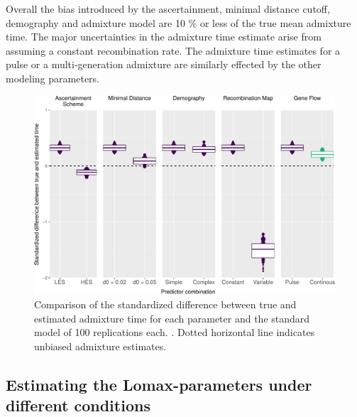 \documentclass[]{article}
\begin{document}
Overall the bias introduced by the ascertainment, minimal distance
cutoff, demography and admixture model are 10 \% or less of the true
mean admixture time. The major uncertainties in the admixture time
estimate arise from assuming a constant recombination rate. The
admixture time estimates for a pulse or a multi-generation admixture are similarly effected by the other modeling parameters.

\begin{figure}
\centering
\includegraphics{Admixture_Time_Inference_Paper_Draft_files/figure-latex/fig3-1.pdf}
\caption{\label{fig:fig3} Comparison of the standardized difference between true and estimated admixture time for each parameter and the standard model of 100 replications each. . Dotted horizontal line indicates unbiased admixture estimates.}
\end{figure}

\subsection{Estimating the Lomax-parameters under different conditions}\label{estimating the Lomax-parameters under different conditions}
\end{document}

